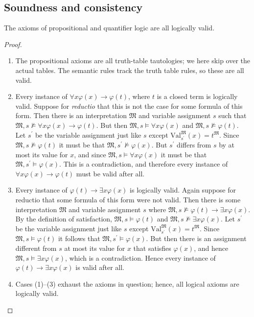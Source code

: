 \documentclass[12pt]{report}
\theoremstyle{nonumberplain}
\newtheorem{proof}{Proof}
\newcommand{\M}{\mathfrak{M}}
\newcommand{\Val}{\mathrm{Val}}
\newcommand{\ValMsp}{\Val^{\M}_{s^{\prime}}}
\begin{document}
\subsection*{Soundness and consistency}

\begin{mt}
The axioms of propositional and quantifier logic are all logically valid.
\end{mt}
\begin{proof}
\begin{enumerate}
\item The propositional axioms are all truth-table tautologies; we here skip over the actual tables. The semantic rules track the truth table rules, so these are all valid.
\item Every instance of $∀xφ(x) → φ(t)$, where $t$ is a closed term is logically valid. Suppose for \emph{reductio} that this is not the case for some formula of this form. Then there is an interpretation $\M$ and variable assignment $s$ such that $\M, s ⊭ ∀xφ(x) → φ(t)$. But then $\M, s ⊨ ∀xφ(x)$ and $\M, s ⊭ φ(t)$. Let $s^\prime$ be the variable assignment just like $s$ except $\ValMsp(x) = t^{\M}$. Since $\M, s ⊭ φ(t)$ it must be that $\M, s^{\prime} ⊭ φ(x)$. But $s^{\prime}$ differs from $s$ by at most its value for $x$, and since $\M, s ⊨ ∀xφ(x)$ it must be that $\M, s^{\prime} ⊨ φ(x)$. This is a contradiction, and therefore every instance of $∀xφ(x) → φ(t)$ must be valid after all.
\item Every instance of $φ(t) → ∃xφ(x)$ is logically valid. Again suppose for reductio that some formula of this form were not valid. Then there is some interpretation $\M$ and variable assignment $s$ where $\M, s ⊭ φ(t) → ∃xφ(x)$. By the definition of satisfaction, $\M, s ⊨ φ(t)$ and $\M, s ⊭ ∃xφ(x)$. Let $s^\prime$ be the variable assignment just like $s$ except $\ValMsp(x) = t^{\M}$. Since $\M, s ⊨ φ(t)$ it follows that $\M, s^{\prime} ⊨ φ(x)$. But then there is an assignment different from $s$ at most its value for $x$ that satisfies $φ(x)$, and hence $\M, s ⊨ ∃xφ(x)$, which is a contradiction. Hence every instance of $φ(t) → ∃xφ(x)$ is valid after all.
\item Cases (1)--(3) exhaust the axioms in question; hence, all logical axioms are logically valid.
\end{enumerate}
\end{proof}
\end{document}
